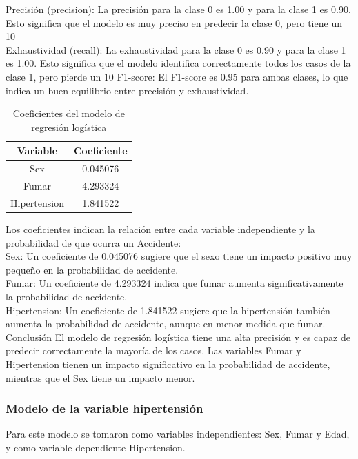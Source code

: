 \documentclass[a4paper, 12pt]{article}
\begin{document}
Precisión (precision): La precisión para la clase 0 es 1.00 y para la clase 1 es 0.90. Esto significa que el modelo es muy preciso en predecir la clase 0, pero tiene un 10%
\\
Exhaustividad (recall): La exhaustividad para la clase 0 es 0.90 y para la clase 1 es 1.00. Esto significa que el modelo identifica correctamente todos los casos de la clase 1, pero pierde un 10%
F1-score: El F1-score es 0.95 para ambas clases, lo que indica un buen equilibrio entre precisión y exhaustividad.

\begin{table}[H]
    \centering
    \begin{tabular}{|c|c|}
        \hline
        Variable & Coeficiente \\ \hline
        Sex & 0.045076 \\ \hline
        Fumar & 4.293324 \\ \hline
        Hipertension & 1.841522 \\ \hline
    \end{tabular}
    \caption{Coeficientes del modelo de regresión logística}
    \label{tab:coeficientes_modelo}
\end{table}

Los coeficientes indican la relación entre cada variable independiente y la probabilidad de que ocurra un Accidente:
\\
Sex: Un coeficiente de 0.045076 sugiere que el sexo tiene un impacto positivo muy pequeño en la probabilidad de accidente.
\\
Fumar: Un coeficiente de 4.293324 indica que fumar aumenta significativamente la probabilidad de accidente.
\\
Hipertension: Un coeficiente de 1.841522 sugiere que la hipertensión también aumenta la probabilidad de accidente, aunque en menor medida que fumar.
\\
Conclusión
El modelo de regresión logística tiene una alta precisión y es capaz de predecir correctamente 
la mayoría de los casos. Las variables Fumar y Hipertension tienen un impacto significativo en 
la probabilidad de accidente, mientras que el Sex tiene un impacto menor.

\subsubsection{Modelo de la variable hipertensión}

Para este modelo se tomaron como variables independientes: Sex, Fumar y Edad, y como
variable dependiente Hipertension.
\end{document}
